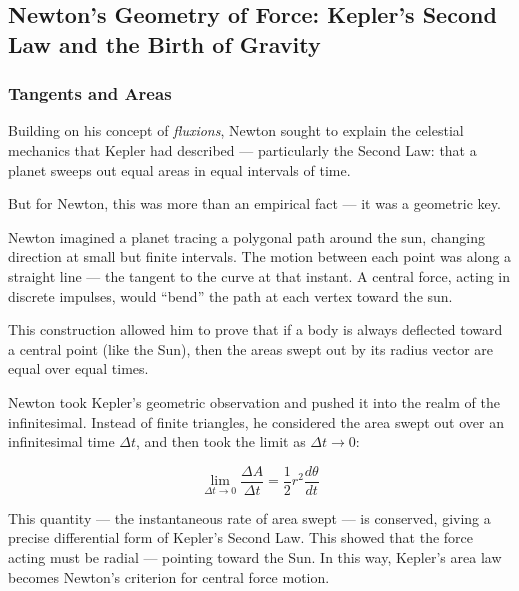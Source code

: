 \subsection{Newton’s Geometry of Force: Kepler’s Second Law and the Birth of Gravity}

\subsubsection{Tangents and Areas} 

Building on his concept of \textit{fluxions}, Newton sought to explain the celestial mechanics that Kepler had described — particularly the Second Law: that a planet sweeps out equal areas in equal intervals of time.

But for Newton, this was more than an empirical fact — it was a geometric key.

Newton imagined a planet tracing a polygonal path around the sun, changing direction at small but finite intervals. The motion between each point was along a straight line — the tangent to the curve at that instant. A central force, acting in discrete impulses, would “bend” the path at each vertex toward the sun.

This construction allowed him to prove that if a body is always deflected toward a central point (like the Sun), then the areas swept out by its radius vector are equal over equal times.

Newton took Kepler’s geometric observation and pushed it into the realm of the infinitesimal. Instead of finite triangles, he considered the area swept out over an infinitesimal time \( \Delta t \), and then took the limit as \( \Delta t \to 0 \):

\[
\lim_{\Delta t \to 0} \frac{\Delta A}{\Delta t} = \frac{1}{2} r^2 \frac{d\theta}{dt}
\]

This quantity — the instantaneous rate of area swept — is conserved, giving a precise differential form of Kepler’s Second Law. This showed that the force acting must be radial — pointing toward the Sun. In this way, Kepler’s area law becomes Newton’s criterion for central force motion.

